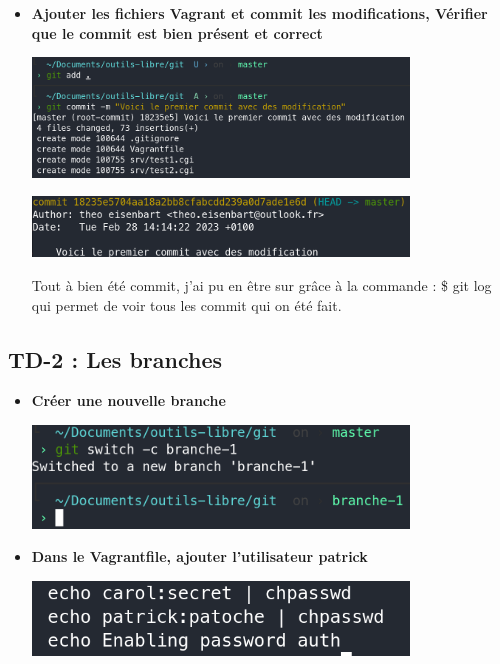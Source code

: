 \documentclass[12pt]{article}
\begin{document}
\begin{itemize}
  \item \textbf{Ajouter les fichiers Vagrant et commit les modifications, Vérifier que le commit est bien présent et correct}
  \vspace{0.3cm}

  \includegraphics[width=10cm]{images/screen-git-td1-6.png}
  \vspace{0.3cm}

  \includegraphics[width=10cm]{images/screen-git-td1-7.png}
  \vspace{0.3cm}

  Tout à bien été commit, j'ai pu en être sur grâce à la commande : \$ git log \newline
  qui permet de voir tous les commit qui on été fait.
\end{itemize}
\vspace{0.3cm}

  \subsection{TD-2 : Les branches}
  \vspace{0.3cm}

\begin{itemize}
  \item \textbf{Créer une nouvelle branche}
  \vspace{0.3cm}

  \includegraphics[width=10cm]{images/screen-git-td2-1.png}
\end{itemize}
\vspace{0.3cm}

\begin{itemize}
  \item \textbf{Dans le Vagrantfile, ajouter l'utilisateur patrick}
  \vspace{0.3cm}

  \includegraphics[width=10cm]{images/screen-git-td2-2.png}
\end{itemize}
\vspace{0.3cm}
\end{document}
